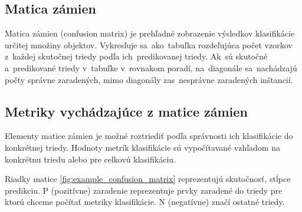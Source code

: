         \subsection{Matica zámien}
            Matica zámien (confusion matrix) je prehľadné zobrazenie výsledkov klasifikácie určitej množiny objektov. Vykresľuje sa~ako~tabuľka rozdeľujúca počet vzorkov z~každej skutočnej triedy podľa ich~predikovanej triedy. Ak~sú skutočné a~predikované triedy v~tabuľke v~rovnakom poradí, na~diagonále sa~nachádzajú počty správne zaradených, mimo diagonály zas~nesprávne zaradených inštancií.

        \subsection{Metriky vychádzajúce z matice zámien}
            Elementy matice zámien je možné roztriediť podľa správnosti ich klasifikácie do konkrétnej triedy. Hodnoty metrík klasifikácie sú vypočítavané vzhľadom na konkrétnu triedu alebo pre celkovú klasifikáciu.

            Riadky matice \ref{fig:example_confusion_matrix} reprezentujú skutočnosť, stĺpce predikciu. P (pozitívne) zaradenie reprezentuje prvky zaradené do triedy pre ktorú chceme počítať metriky klasifikácie. N (negatívne) značí ostatné triedy.

